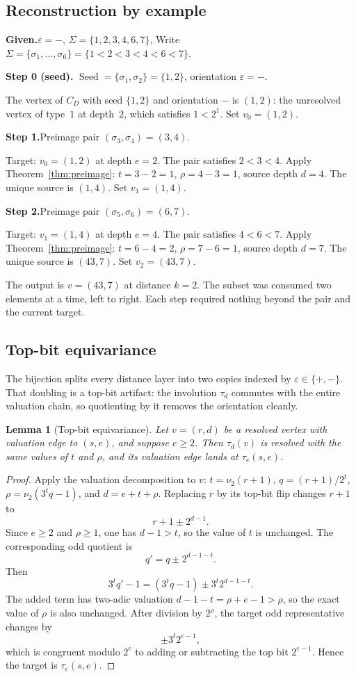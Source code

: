 \documentclass[11pt]{amsart}
\newtheorem{lemma}[theorem]{Lemma}
\theoremstyle{definition}
\theoremstyle{remark}
\newcommand{\nuu}{\nu_2}
\newcommand{\Seed}{\operatorname{Seed}}
\newcommand{\eps}{\varepsilon}
\begin{document}
\subsection{Reconstruction by example}\hfill \break
\textbf{Given.}\enspace $\eps=-$, $\Sigma=\{1,2,3,4,6,7\}$,
Write $\Sigma=\{\sigma_1,\ldots,\sigma_6\}=\{1<2<3<4<6<7\}$.

\textbf{Step 0 (seed).}\enspace
$\Seed=\{\sigma_1,\sigma_2\}=\{1,2\}$, orientation $\eps=-$.

The vertex of $C_D$ with seed $\{1,2\}$ and orientation $-$ is
$(1,2)$: the unresolved vertex of type~$1$ at depth~$2$, which
satisfies $1<2^1$.  Set $v_0=(1,2)$.

\textbf{Step 1.}\enspace Preimage pair
$(\sigma_3,\sigma_4)=(3,4)$.

Target: $v_0=(1,2)$ at depth $e=2$.  The pair satisfies $2<3<4$.
Apply Theorem~\ref{thm:preimage}: $t=3-2=1$, $\rho=4-3=1$, source
depth $d=4$.  The unique source is $(1,4)$.  Set $v_1=(1,4)$.

\textbf{Step 2.}\enspace Preimage pair
$(\sigma_5,\sigma_6)=(6,7)$.

Target: $v_1=(1,4)$ at depth $e=4$.  The pair satisfies $4<6<7$.
Apply Theorem~\ref{thm:preimage}: $t=6-4=2$, $\rho=7-6=1$, source
depth $d=7$.  The unique source is $(43,7)$.  Set $v_2=(43,7)$.

The output is $v=(43,7)$ at distance $k=2$.  The subset was consumed
two elements at a time, left to right.  Each step required nothing
beyond the pair and the current target.

\subsection{Top-bit equivariance}\label{subsec:topbit}

The bijection splits every distance layer into two copies indexed by
$\eps\in\{+,-\}$.  That doubling is a top-bit artifact: the
involution $\tau_d$ commutes with the entire valuation chain, so
quotienting by it removes the orientation cleanly.

\begin{lemma}[Top-bit equivariance]\label{lem:topbit}
Let $v=(r,d)$ be a resolved vertex with valuation edge to $(s,e)$,
and suppose $e\ge2$.  Then $\tau_d(v)$ is resolved with the same
values of $t$ and $\rho$, and its valuation edge lands at
$\tau_e(s,e)$.
\end{lemma}

\begin{proof}
Apply the valuation decomposition to $v$: $t=\nuu(r+1)$,
$q=(r+1)/2^t$, $\rho=\nuu(3^tq-1)$, and $d=e+t+\rho$.  Replacing
$r$ by its top-bit flip changes $r+1$ to
\[
r+1\pm2^{d-1}.
\]
Since $e\ge2$ and $\rho\ge1$, one has $d-1>t$, so the value of $t$
is unchanged.  The corresponding odd quotient is
\[
q'=q\pm2^{d-1-t}.
\]
Then
\[
3^tq'-1=(3^tq-1)\pm3^t2^{d-1-t}.
\]
The added term has two-adic valuation $d-1-t=\rho+e-1>\rho$, so the
exact value of $\rho$ is also unchanged.  After division by $2^\rho$,
the target odd representative changes by
\[
\pm 3^t2^{e-1},
\]
which is congruent modulo $2^e$ to adding or subtracting the top bit
$2^{e-1}$.  Hence the target is $\tau_e(s,e)$.
\end{proof}
\end{document}
